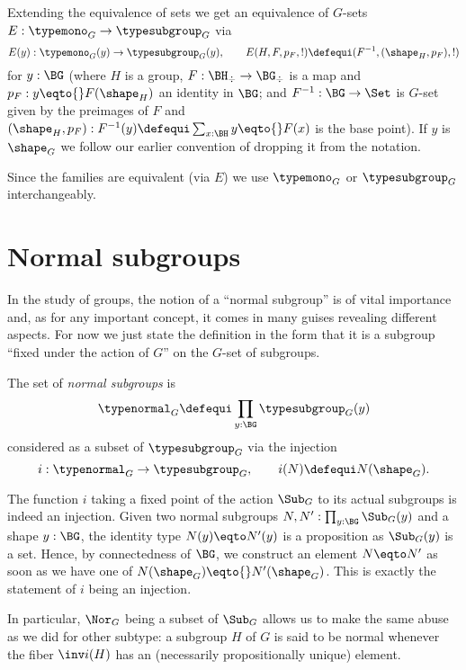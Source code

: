 \begin{definition}
  Extending the equivalence of sets we get an equivalence of $G$-sets $E:\typemono_G\to\typesubgroup_G$ via
$$
E(y):\typemono_G(y)\to\typesubgroup_G(y),\qquad E(H,F,p_F,!)\defequi(F^{-1}, (\shape_H,p_F),!)
$$
for $y:\BG$ (where $H$ is a group, $F:\BH_\div\to \BG_\div$ is a map and $p_F:y\eqto{}F(\shape_H)$ an identity in $\BG$; and $F^{-1}:\BG\to\Set$ is $G$-set given by the preimages of $F$ and $(\shape_H,p_F):F^{-1}(y)\defequi \sum_{x:\BH}y\eqto{}F(x)$ is the base point).  If $y$ is $\shape_G$ we follow our earlier convention of dropping it from the notation.
\end{definition}



Since the families are equivalent (via $E$) we use $\typemono_G$ or $\typesubgroup_G$ interchangeably.

\section{Normal subgroups}
\label{sec:normal}
In the study of groups, the notion of a ``normal subgroup'' is of vital importance
and, as for any important concept, it comes in many guises revealing different aspects.
For now we just state the definition in the form that it is a subgroup ``fixed under the action of $G$'' on the $G$-set of subgroups.

\begin{definition}
  \label{def:normalsubgroup}
  The set of \emph{normal subgroups} is
  $$\typenormal_G\defequi\prod_{y:\BG}\typesubgroup_G(y)$$
  considered as a subset of $\typesubgroup_G$ via the injection
  $$i:\typenormal_G\to\typesubgroup_G,\qquad i(N)\defequi N(\shape_G).$$
\end{definition}
\begin{remark}
  The function $i$ taking a fixed point of the action $\Sub_G$ to its actual
  subgroups is indeed an injection.
  Given two normal subgroups %
  $N,N':\prod_{y:\BG} \Sub_G(y)$ and a shape $y:\BG$, the identity type $N(y) \eqto N'(y)$ is a
  proposition as $\Sub_G(y)$ is a set. Hence, by connectedness of $\BG$, we
  construct an element $N \eqto N'$ as soon as we have one of
  $N(\shape_G) \eqto{} N'(\shape_G)$. This is exactly the statement of $i$ being an
  injection.

  In particular, $\Nor_G$ being a subset of $\Sub_G$ allows us to make the same
  abuse as we did for other subtype: a subgroup $H$ of $G$ is said to be normal
  whenever the fiber $\inv i (H)$ has an (necessarily propositionally unique)
  element.
\end{remark}



